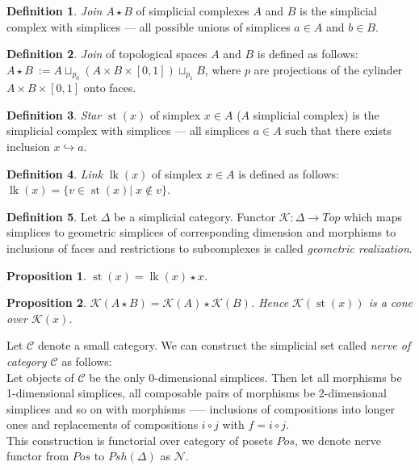 \documentclass[a4paper, 12pt]{article}
\newtheorem{proposition}{Proposition}
\theoremstyle{definition}
\newtheorem{definition}{Definition}
\theoremstyle{remark}
\newcommand{\define}[1]{{\textit{#1}}}
\begin{document}
\begin{definition}
  \define{Join} $A \star B$ of simplicial complexes $A$ and $B$ is the simplicial complex with simplices --- all possible unions of simplices $a \in A$ and $b \in B$.
\end{definition}

\begin{definition}
  \define{Join} of topological spaces $A$ and $B$ is defined as follows: $A \star B\ := A \sqcup_{p_0} (A \times B \times [0,1]) \sqcup_{p_1} B$, where $p$ are projections of the cylinder $A \times B \times [0,1]$ onto faces.
\end{definition}

\begin{definition}
  \define{Star} $\operatorname{st}(x)$ of simplex $x \in A$ ($A$ simplicial complex) is the simplicial complex with simplices --- all simplices $a \in A$ such that there exists inclusion $x \hookrightarrow a$.
\end{definition}

\begin{definition}
  \define{Link} $\operatorname{lk}(x)$ of simplex $x \in A$ is defined as follows: $\operatorname{lk}(x) = \{v \in \operatorname{st}(x)|\; x \not\in v\}$.
\end{definition}

\begin{definition}
  Let $\Delta$ be a simplicial category. Functor $\mathcal{K} : \Delta \to Top$ which maps simplices to geometric simplices of corresponding dimension and morphisms to inclusions of faces and restrictions to subcomplexes is called \define{geometric realization}.
\end{definition}

\begin{proposition}
  $\operatorname{st}(x) = \operatorname{lk}(x) \star x$.
\end{proposition}

\begin{proposition}
  $\mathcal{K}(A \star B) = \mathcal{K}(A) \star \mathcal{K}(B)$. Hence $\mathcal{K}(\operatorname{st}(x))$ is a cone over $\mathcal{K}(x)$.
\end{proposition}

Let $\mathcal{C}$ denote a small category. We can construct the simplicial set called \define{nerve of category $\mathcal{C}$} as follows:\\
Let objects of $\mathcal{C}$ be the only 0-dimensional simplices. Then let all morphisms be 1-dimensional simplices, all composable pairs of morphisms be 2-dimensional simplices and so on with morphisms ----- inclusions of compositions into longer ones and replacements of compositions $i \circ j$ with $f = i \circ j$.\\
This construction is functorial over category of posets $Pos$, we denote nerve functor from $Pos$ to $Psh(\Delta)$ as $\mathcal{N}$.
\end{document}
